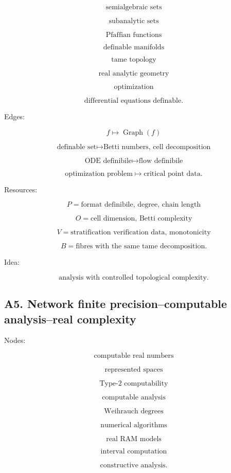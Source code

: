 \documentclass[11pt]{article}
\begin{document}
\[
\text{semialgebraic sets}
\]

\[
\text{subanalytic sets}
\]

\[
\text{Pfaffian functions}
\]

\[
\text{definable manifolds}
\]

\[
\text{tame topology}
\]

\[
\text{real analytic geometry}
\]

\[
\text{optimization}
\]

\[
\text{differential equations definable}.
\]

Edges:

\[
f\mapsto \operatorname{Graph}(f)
\]

\[
\text{definable set}\mapsto \text{Betti numbers, cell decomposition}
\]

\[
\text{ODE definibile}\mapsto \text{flow definibile}
\]

\[
\text{optimization problem}\mapsto \text{critical point data}.
\]

Resources:

\[
P=\text{format definibile, degree, chain length}
\]

\[
O=\text{cell dimension, Betti complexity}
\]

\[
V=\text{stratification verification data, monotonicity}
\]

\[
B=\text{fibres with the same tame decomposition}.
\]

Idea:

\[
\text{analysis with controlled topological complexity}.
\]



\subsection{A5. Network finite precision--computable analysis--real complexity}

Nodes:

\[
\text{computable real numbers}
\]

\[
\text{represented spaces}
\]

\[
\text{Type-2 computability}
\]

\[
\text{computable analysis}
\]

\[
\text{Weihrauch degrees}
\]

\[
\text{numerical algorithms}
\]

\[
\text{real RAM models}
\]

\[
\text{interval computation}
\]

\[
\text{constructive analysis}.
\]
\end{document}
